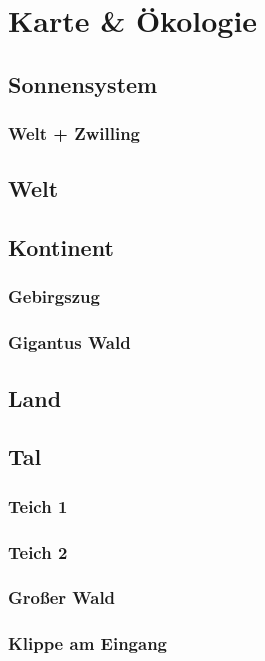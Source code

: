 \section{Karte \& Ökologie}
\subsection{Sonnensystem}
\subsubsection{Welt + Zwilling}

\subsection{Welt}
\subsection{Kontinent}
\subsubsection{Gebirgszug}
\subsubsection{Gigantus Wald}

\subsection{Land}
\subsection{Tal}
\subsubsection{Teich 1}
\subsubsection{Teich 2}
\subsubsection{Großer Wald}
\subsubsection{Klippe am Eingang}

